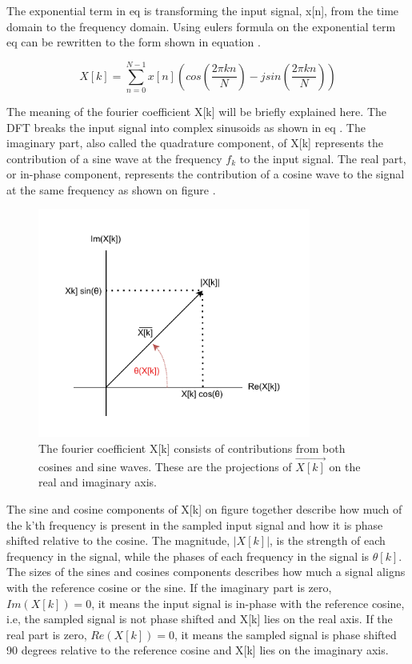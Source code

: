 The exponential term in eq  is transforming the input signal, x[n], from the time domain to the frequency domain. Using eulers formula on the exponential term eq  can be rewritten to the form shown in equation .

\begin{equation}\label{eq:4_7_2_SA2}
    X[k] = \sum_{n=0}^{N-1} x[n] \left(cos\left(\frac{2\pi kn}{N}\right) -jsin\left(\frac{2\pi kn}{N}\right)\right)
\end{equation}

The meaning of the fourier coefficient X[k] will be briefly explained here. The DFT breaks the input signal into complex sinusoids as shown in eq . The imaginary part, also called the quadrature component, of X[k] represents the contribution of a sine wave at the frequency $f_k$ to the input signal. The real part, or in-phase component, represents the contribution of a cosine wave to the signal at the same frequency as shown on figure .
\begin{figure}[H]
    \centering
    \includegraphics[clip, trim=0 0 0 0, width=0.8\textwidth]{Sections/7_SystemDesign/Figures/7_3_2_DFTUnderstand1.pdf}
    \caption{The fourier coefficient X[k] consists of contributions from both cosines and sine waves. These are the projections of $\vec{X[k]}$ on the real and imaginary axis.}
    \label{fig:7_3_2_DFTU1}
\end{figure}

The sine and cosine components of X[k] on figure  together describe how much of the k'th frequency is present in the sampled input signal and how it is phase shifted relative to the cosine. The magnitude, $|X[k]|$, is the strength of each frequency in the signal, while the phases of each frequency in the signal is $\theta[k]$. The sizes of the sines and cosines components describes how much a signal aligns with the reference cosine or the sine. If the imaginary part is zero, $Im(X[k]) = 0$,  it means the input signal is in-phase with the reference cosine, i.e, the sampled signal is not phase shifted and X[k] lies on the real axis. If the real part is zero, $Re(X[k]) = 0$, it means the sampled signal is phase shifted 90 degrees relative to the reference cosine and X[k] lies on the imaginary axis.

